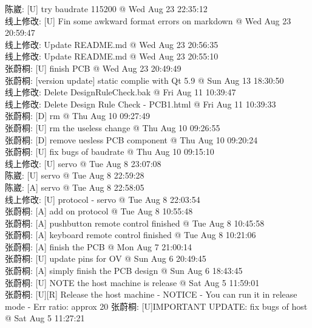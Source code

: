 \documentclass[a4paper]{paper}
\begin{document}
陈崴: [U] try baudrate 115200 @ Wed Aug 23 22:35:12\\ 
线上修改: [U] Fin some awkward format errors on markdown @ Wed Aug 23 20:59:47\\ 
线上修改: Update README.md @ Wed Aug 23 20:56:35\\ 
线上修改: Update README.md @ Wed Aug 23 20:55:10\\ 
张蔚桐: [U] finish PCB @ Wed Aug 23 20:49:49\\ 
张蔚桐: [version update] static complie with Qt 5.9 @ Sun Aug 13 18:30:50\\ 
线上修改: Delete DesignRuleCheck.bak @ Fri Aug 11 10:39:47\\ 
线上修改: Delete Design Rule Check - PCB1.html @ Fri Aug 11 10:39:33\\ 
张蔚桐: [D] rm @ Thu Aug 10 09:27:49\\ 
张蔚桐: [U] rm the useless change @ Thu Aug 10 09:26:55\\ 
张蔚桐: [D] remove uesless PCB component @ Thu Aug 10 09:20:24\\ 
张蔚桐: [U] fix bugs of baudrate @ Thu Aug 10 09:15:10\\ 
线上修改: [U] servo @ Tue Aug 8 23:07:08\\ 
陈崴: [U] servo @ Tue Aug 8 22:59:28\\ 
陈崴: [A] servo @ Tue Aug 8 22:58:05\\ 
线上修改: [U] protocol - servo @ Tue Aug 8 22:03:54\\ 
张蔚桐: [A] add on protocol @ Tue Aug 8 10:55:48\\ 
张蔚桐: [A] pushbutton remote control finished @ Tue Aug 8 10:45:58\\ 
张蔚桐: [A] keyboard remote control finished @ Tue Aug 8 10:21:06\\ 
张蔚桐: [A] finish the PCB @ Mon Aug 7 21:00:14\\ 
张蔚桐: [U] update pins for OV @ Sun Aug 6 20:49:45\\ 
张蔚桐: [A] simply finish the PCB design @ Sun Aug 6 18:43:45\\ 
张蔚桐: [U] NOTE the host machine is release @ Sat Aug 5 11:59:01\\ 
张蔚桐: [U][R] Release the host machine - NOTICE     - You can run it in release mode     - Err ratio: approx 20%
张蔚桐: [U]IMPORTANT UPDATE: fix bugs of host @ Sat Aug 5 11:27:21\\ 
\end{document}
